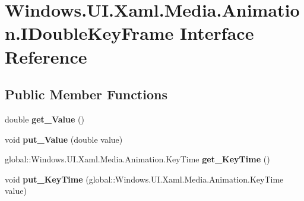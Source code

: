 \hypertarget{interface_windows_1_1_u_i_1_1_xaml_1_1_media_1_1_animation_1_1_i_double_key_frame}{}\section{Windows.\+U\+I.\+Xaml.\+Media.\+Animation.\+I\+Double\+Key\+Frame Interface Reference}
\label{interface_windows_1_1_u_i_1_1_xaml_1_1_media_1_1_animation_1_1_i_double_key_frame}
\subsection*{Public Member Functions}
\begin{DoxyCompactItemize}
\item 
\mbox{\label{interface_windows_1_1_u_i_1_1_xaml_1_1_media_1_1_animation_1_1_i_double_key_frame_aa6f676c3479f134fab59f2ae812e3ffd}} 
double {\bfseries get\+\_\+\+Value} ()
\item 
\mbox{\label{interface_windows_1_1_u_i_1_1_xaml_1_1_media_1_1_animation_1_1_i_double_key_frame_a2e2235aea49078188c36c1f9080d58a9}} 
void {\bfseries put\+\_\+\+Value} (double value)
\item 
\mbox{\label{interface_windows_1_1_u_i_1_1_xaml_1_1_media_1_1_animation_1_1_i_double_key_frame_acbf6eb01d1f5653483101308780bcf9c}} 
global\+::\+Windows.\+U\+I.\+Xaml.\+Media.\+Animation.\+Key\+Time {\bfseries get\+\_\+\+Key\+Time} ()
\item 
\mbox{\label{interface_windows_1_1_u_i_1_1_xaml_1_1_media_1_1_animation_1_1_i_double_key_frame_a2a3791646e36b2ce46d0900686e544f5}} 
void {\bfseries put\+\_\+\+Key\+Time} (global\+::\+Windows.\+U\+I.\+Xaml.\+Media.\+Animation.\+Key\+Time value)
\item 
\mbox{\label{interface_windows_1_1_u_i_1_1_xaml_1_1_media_1_1_animation_1_1_i_double_key_frame_aa6f676c3479f134fab59f2ae812e3ffd}} 

\end{DoxyCompactItemize}
